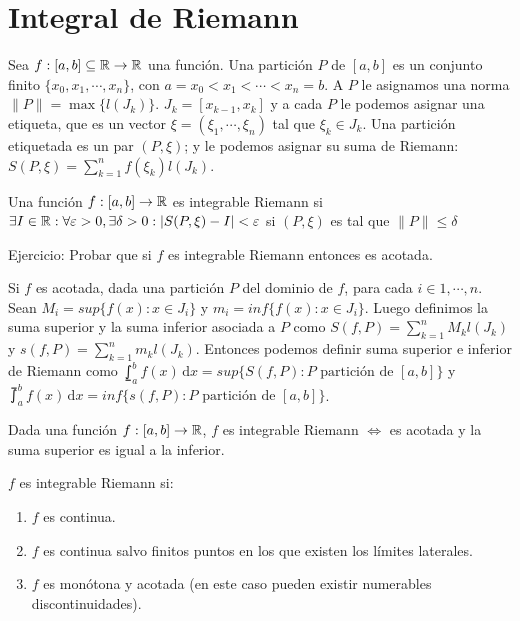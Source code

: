 \section{Integral de Riemann}

Sea $f: [a, b] \subseteq \mathbb{R} \to \mathbb{R}$ una función.
Una partición $P$ de $[a, b]$ es un conjunto finito $\{ x_0, x_1, \cdots, x_n \}$, con
$a = x_0 < x_1 < \cdots < x_n = b$. A $P$ le asignamos una norma $\| P \| = \max \{ l(J_k) \}$. $J_k = [x_{k-1}, x_k]$ y a cada $P$ le
podemos asignar una etiqueta, que es un vector $\xi = (\xi_1, \cdots, \xi_n)$ tal que $\xi_k \in J_k$. Una partición etiquetada es un par
$(P, \xi)$; y le podemos asignar su suma de Riemann: $S(P, \xi) = \sum_{k=1}^{n} f(\xi_k) l(J_k)$.

\begin{definition}
    Una función $f: [a, b] \to \mathbb{R}$ es integrable Riemann si $\exists I \in \mathbb{R} : \forall \varepsilon > 0, \exists \delta > 0 : | S(P, \xi) - I | < \varepsilon$ si $(P, \xi)$ es tal que $\| P \| \leq \delta$
\end{definition}

Ejercicio: Probar que si $f$ es integrable Riemann entonces es acotada.

Si $f$ es acotada, dada una partición $P$ del dominio de $f$, para cada $i \in 1, \cdots, n$. Sean $M_i = sup \{ f(x) : x \in J_i \}$ y
$m_i = inf\{ f(x) : x \in J_i \}$. Luego definimos la suma superior y la suma inferior asociada a $P$ como $S(f, P) = \sum_{k=1}^{n} M_k l(J_k)$ y
$s(f, P) = \sum_{k=1}^{n} m_k l(J_k)$. Entonces podemos definir suma superior e inferior de Riemann como
$\lowint_a^b f(x) \, \mathrm{d}x = sup \{ S(f, P) : P \text{ partición de } [a, b] \}$ y
$\upint_a^b f(x) \, \mathrm{d}x = inf \{ s(f, P) : P \text{ partición de } [a, b] \}$.

\begin{prop}
    Dada una función $f: [a, b] \to \mathbb{R}$, $f$ es integrable Riemann $\iff$ es acotada y la suma superior es igual a la inferior.
\end{prop}

\begin{note}
    $f$ es integrable Riemann si: \begin{enumerate}
        \item $f$ es continua.
        \item $f$ es continua salvo finitos puntos en los que existen los límites laterales.
        \item $f$ es monótona y acotada (en este caso pueden existir numerables discontinuidades).
    \end{enumerate}
\end{note}

